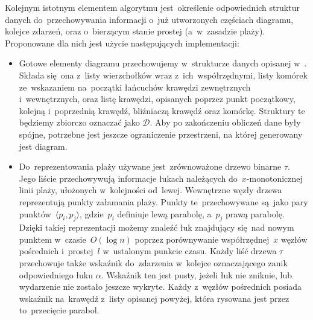 \documentclass[skorowidz,autorrok,backref,xodstep,oswiadczenie]{wmimgr}
\begin{document}
Kolejnym istotnym elementem algorytmu jest~określenie odpowiednich struktur danych do~przechowywania informacji o~już utworzonych częściach diagramu, kolejce zdarzeń, oraz o~bierzącym stanie prostej (a~w~zasadzie plaży). Proponowane dla nich jest użycie następujących implementacji:
\begin{itemize}
\item
Gotowe elementy diagramu przechowujemy w~strukturze danych opisanej w~\cite{geometria}. Składa się~ona z~listy wierzchołków wraz z~ich~współrzędnymi, listy komórek ze~wskazaniem na~początki łańcuchów krawędzi zewnętrznych i~wewnętrznych, oraz listę krawędzi, opisanych poprzez punkt początkowy, kolejną i~poprzednią krawędź, bliźniaczą krawędź oraz komórkę. Struktury te będziemy zbiorczo oznaczać jako $\mathcal{D}$. Aby po zakończeniu obliczeń dane były spójne, potrzebne jest jeszcze ograniczenie przestrzeni, na której generowany jest diagram.
\item
Do~reprezentowania plaży używane jest~zrównoważone drzewo binarne $\tau$. Jego liście przechowywują informacje łukach należących do~$x$-monotonicznej linii plaży, ułożonych w~kolejności od~lewej. Wewnętrzne węzły drzewa reprezentują punkty załamania plaży. Punkty te~przechowywane są~jako pary punktów~$\langle p_{i}, p_{j}\rangle$, gdzie~$p_{i}$ definiuje lewą parabolę, a~$p_{j}$ prawą parabolę. Dzięki takiej reprezentacji możemy znaleźć łuk znajdujący się~nad nowym punktem w~czasie~$O(\log{n})$ poprzez porównywanie współrzędnej~$x$ węzłów pośrednich i~prostej~$l$ w~ustalonym punkcie czasu.
Każdy liść drzewa $\tau$ przechowuje także wskaźnik do~zdarzenia w~kolejce oznaczającego zanik odpowiedniego łuku $\alpha$. Wskaźnik ten jest pusty, jeżeli łuk nie zniknie, lub wydarzenie nie zostało jeszcze wykryte. Każdy z~węzłów pośrednich posiada wskaźnik na~krawędź z~listy opisanej powyżej, która rysowana jest przez to~przecięcie parabol.


\end{itemize}
\end{document}
